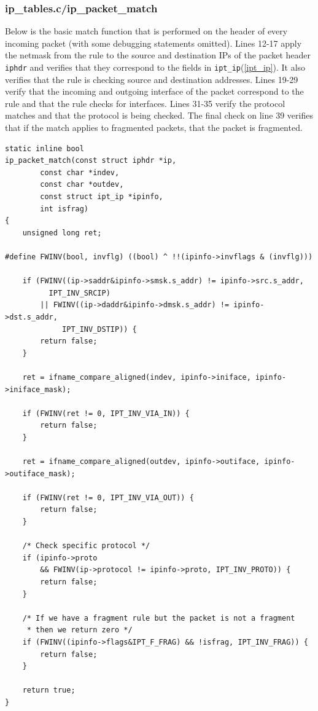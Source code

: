 \documentclass[a4paper,10pt]{article}
\newcommand{\code}[1]{\texttt{{#1}}}
\begin{document}
\subsubsection{ip\_tables.c/ip\_packet\_match}

Below is the basic match function that is performed on the header of
every incoming packet (with some debugging statements omitted). Lines
12-17 apply the netmask from the rule to the source and destination
IPs of the packet header \code{iphdr} and verifies that they
correspond to the fields in \code{ipt\_ip}(\ref{ipt_ip}). It also
verifies that the rule is checking source and destination
addresses. Lines 19-29 verify that the incoming and outgoing interface
of the packet correspond to the rule and that the rule checks for
interfaces. Lines 31-35 verify the protocol matches and that the
protocol is being checked. The final check on line 39 verifies that if
the match applies to fragmented packets, that the packet is
fragmented.


\lstset{stepnumber=1,frame=single,numbers=left,numberstyle=\footnotesize}

\begin{lstlisting}
static inline bool
ip_packet_match(const struct iphdr *ip,
		const char *indev,
		const char *outdev,
		const struct ipt_ip *ipinfo,
		int isfrag)
{
	unsigned long ret;

#define FWINV(bool, invflg) ((bool) ^ !!(ipinfo->invflags & (invflg)))

	if (FWINV((ip->saddr&ipinfo->smsk.s_addr) != ipinfo->src.s_addr,
		  IPT_INV_SRCIP)
	    || FWINV((ip->daddr&ipinfo->dmsk.s_addr) != ipinfo->dst.s_addr,
		     IPT_INV_DSTIP)) {
		return false;
	}

	ret = ifname_compare_aligned(indev, ipinfo->iniface, ipinfo->iniface_mask);

	if (FWINV(ret != 0, IPT_INV_VIA_IN)) {
		return false;
	}

	ret = ifname_compare_aligned(outdev, ipinfo->outiface, ipinfo->outiface_mask);

	if (FWINV(ret != 0, IPT_INV_VIA_OUT)) {
		return false;
	}

	/* Check specific protocol */
	if (ipinfo->proto
	    && FWINV(ip->protocol != ipinfo->proto, IPT_INV_PROTO)) {
		return false;
	}

	/* If we have a fragment rule but the packet is not a fragment
	 * then we return zero */
	if (FWINV((ipinfo->flags&IPT_F_FRAG) && !isfrag, IPT_INV_FRAG)) {
		return false;
	}

	return true;
}
\end{lstlisting}
\end{document}

